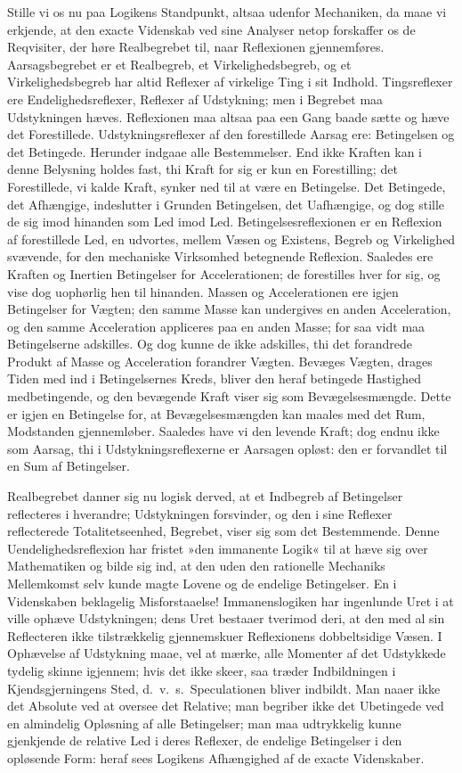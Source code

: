 \documentclass[12pt]{book}
\newcommand{\apage}[1]{\marginnote{\footnotesize\textit{[#1]}}}
\begin{document}
Stille vi os nu paa Logikens Standpunkt, altsaa udenfor Mechaniken, da
maae vi erkjende, at den exacte Videnskab ved sine Analyser netop
forskaffer os de Reqvisiter, der høre Realbegrebet til, naar Reflexionen
gjennemføres. Aarsagsbegrebet er et Realbegreb, et Virkelighedsbegreb, og
et Virkelighedsbegreb har altid Reflexer af virkelige Ting i sit Indhold.
Tingsreflexer ere Endelighedsreflexer, Reflexer af Udstykning; men i
Begrebet maa Udstykningen hæves. Reflexionen maa altsaa paa een Gang baade
sætte og hæve det Forestillede. Udstykningsreflexer af den forestillede
Aarsag ere: Betingelsen og det Betingede. Herunder indgaae alle
Bestemmelser. End ikke Kraften kan i denne Belysning holdes fast, thi Kraft
for sig er kun en Forestilling; det Forestillede, vi kalde Kraft, synker
ned til at være en Betingelse. Det Betingede, det Afhængige, indeslutter i
Grunden Betingelsen, det Uafhængige, og dog stille de sig imod hinanden som
Led imod Led. Betingelsesreflexionen er en Reflexion af forestillede Led,
en udvortes, mellem Væsen og Existens, Begreb og Virkelighed svævende, for
den mechaniske Virksomhed betegnende Reflexion. Saaledes ere Kraften og
Inertien Betingelser for  \apage{133} Accelerationen; de forestilles hver for sig, og
vise dog uophørlig hen til hinanden. Massen og Accelerationen ere igjen
Betingelser for Vægten; den samme Masse kan undergives en anden
Acceleration, og den samme Acceleration appliceres paa en anden Masse; for
saa vidt maa Betingelserne adskilles. Og dog kunne de ikke adskilles, thi
det forandrede Produkt af Masse og Acceleration forandrer Vægten. Bevæges
Vægten, drages Tiden med ind i Betingelsernes Kreds, bliver den heraf
betingede Hastighed medbetingende, og den bevægende Kraft viser sig som
Bevægelsesmængde. Dette er igjen en Betingelse for, at Bevægelsesmængden
kan maales med det Rum, Modstanden gjennemløber. Saaledes have vi den
levende Kraft; dog endnu ikke som Aarsag, thi i Udstykningsreflexerne er
Aarsagen opløst: den er forvandlet til en Sum af Betingelser.

Realbegrebet danner sig nu logisk derved, at et Indbegreb af Betingelser
reflecteres i hverandre; Udstykningen forsvinder, og den i sine Reflexer
reflecterede Totalitetseenhed, Begrebet, viser sig som det Bestemmende.
Denne Uendelighedsreflexion har fristet »den immanente Logik« til at hæve
sig over Mathematiken og bilde sig ind, at den uden den rationelle
Mechaniks Mellemkomst selv kunde magte Lovene og de endelige Betingelser.
En i Videnskaben beklagelig Misforstaaelse! Immanenslogiken har ingenlunde
Uret i at ville ophæve Udstykningen; dens Uret bestaaer tverimod deri, at
den med al sin Reflecteren ikke tilstrækkelig gjennemskuer Reflexionens
dobbeltsidige \apage{134} Væsen. I Ophævelse af Udstykning maae, vel at mærke, alle
Momenter af det Udstykkede tydelig skinne igjennem; hvis det ikke skeer,
saa træder Indbildningen i Kjendsgjerningens Sted, d.\ v.\ s.\ Speculationen
bliver indbildt. Man naaer ikke det Absolute ved at oversee det Relative;
man begriber ikke det Ubetingede ved en almindelig Opløsning af alle
Betingelser; man maa udtrykkelig kunne gjenkjende de relative Led i deres
Reflexer, de endelige Betingelser i den opløsende Form: heraf sees Logikens
Afhængighed af de exacte Videnskaber.
\end{document}

